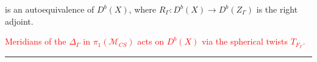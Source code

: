 \documentclass[a0]{a0poster}
\begin{document}
\begin{textblock}{7}
\begin{center}
\end{center}
is an autoequivalence of $D^b(X)$, where $R_\Gamma : D^b(X) \to D^b(Z_\Gamma)$ is the right adjoint.
\textcolor{Red}{
  \begin{center}
  Meridians of the $\Delta_\Gamma$ in $\pi_1(\mathcal{M}_{CS})$ acts on $D^b(X)$ via the spherical twists $T_{F_\Gamma}$.
  \end{center}
}
\bigskip
\hrule
\end{textblock}

\end{document}
